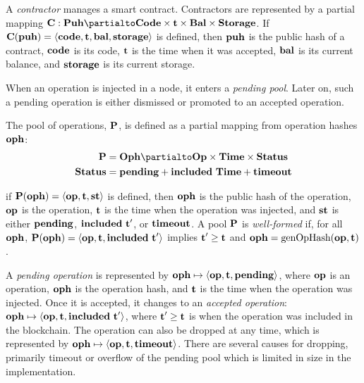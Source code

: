 \documentclass[a4paper]{llncs}
\begin{document}
\begin{definition}%
  A \emph{contractor} manages a smart contract. Contractors are
  represented by a partial mapping $\CONTRACTORS : \TPUH \partialto
  \TCODE \times \TIME  \times \TBAL \times  \TSTORAGE$. If $\textbf{C} (\textbf{puh}) = \langle
  \textbf{code}, \textbf{t}, \textbf{bal}, \textbf{storage} \rangle $ is defined, then $\textbf{puh}$ is the
  public hash of a contract,
  $\textbf{code}$ is its  code,
  $\textbf{t}$ is the time when it was accepted,
  $\textbf{bal}$ is its current balance,
  and $\textbf{storage}$ is its current storage.
\end{definition}

When an operation is injected in a node, it enters a \emph{pending
  pool}. Later on, such a pending operation is either dismissed or
promoted to an accepted operation.

\begin{definition}
  The pool of operations, $\textbf{P}$, is defined as a partial mapping from
  operation hashes $\textbf{oph}$: 
  \begin{align*}
    \PENDING &= \TOPH \partialto \TOP\times \TTIME \times \TSTATUS \\
    \TSTATUS&= \STATUSPENDING + \STATUSINCLUDED\ \TTIME + \STATUSTIMEOUT
  \end{align*}
  
  if $\textbf{P}(\textbf{oph}) = \langle  \textbf{op}, \textbf{t}, \textbf{st}
\rangle $ is defined, then $\textbf{oph}$ is the public hash of the operation, $\textbf{op}$ is the operation, $\textbf{t}$ is the time when the
operation was injected, and $\textbf{st}$ is either $\textbf{pending}$,
$\textbf{included}\ \textbf{t}'$, or $\textbf{timeout}$.
A pool $\textbf{P}$ is \emph{well-formed} if, for all $\textbf{oph}$, $\textbf{P} (\textbf{oph}) =
  \langle\textbf{op},\textbf{t}, \textbf{included}\ \textbf{t}'\rangle$ implies $\textbf{t}' \ge
  \textbf{t}$ and $\textbf{oph} = \textup{genOpHash} (\textbf{op}, \textbf{t})$.
\end{definition}


A \emph{pending operation} is represented by
$\textbf{oph} \mapsto \langle  \textbf{op}, \textbf{t}, \textbf{pending}\rangle $,
where $\textbf{op}$ is an operation, $\textbf{oph}$ is the operation hash,
and $\textbf{t}$ is the time when the operation was injected.
Once it is accepted, it changes to an \emph{accepted operation}:
$\textbf{oph} \mapsto \langle  \textbf{op}, \textbf{t}, \textbf{included}\ \textbf{t}'\rangle $, where
$\textbf{t}' \ge \textbf{t}$ is  when the operation was included in the
blockchain.  The operation can also be dropped at any time, which is
represented by
$\textbf{oph} \mapsto \langle  \textbf{op}, \textbf{t}, \textbf{timeout}\rangle $. There are several
causes for dropping, primarily timeout or overflow of the pending
pool which is limited in size in the implementation.
\end{document}
